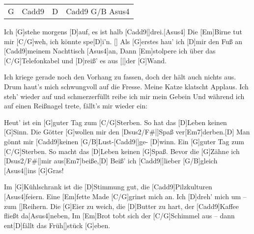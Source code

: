 

\vspace{-0.5em}


\vspace{-1em}
\begin{guitar}
	{\footnotesize\begin{tabular}{|l|l|l|l|}
			G & Cadd9 & D & Cadd9 G/B Asus4 
	\end{tabular}}

	Ich [G]stehe morgens [D]auf, es ist halb [Cadd9|]{drei.}[Asus4]{}
	Die [Em]Birne tut mir [C/G]weh, ich könnte spe[D]i'n. []{}
	Als [G]erstes hau' ich [D]mir den Fuß an [Cadd9]meinem Nachttisch [Asus4]an,
	Dann [Em]stolpere ich über das [C/G]Telefonkabel und [D]reiß' es aus [|]{der} [G]Wand.
	
	Ich kriege gerade noch den Vorhang zu fassen, doch der hält auch nichts aus.
	Drum haut's mich schwungvoll auf die Fresse. Meine Katze klatscht Applaus.
	Ich steh' wieder auf und schmerzerfüllt reibe ich mir mein Gebein
	Und während ich auf einen Reißnagel trete, fällt's mir wieder ein:
	
	\begin{highlightbar}
		Heut' ist ein [G]guter Tag zum [C/G]Sterben.
		So hat das [D]Leben keinen [G]Sinn.
		Die Götter [G]wollen mir den [Dsus2/F#|]{Spaß} ver[Em7]derben.[D]{}
		Man gönnt mir [Cadd9]keinen [G/B]Lust-[Cadd9|]{ge-} [D]winn.
		Ein [G]guter Tag zum [C/G]Sterben.
		So macht das [D]Leben keinen [G]Spaß.
		Bevor die [G]Zähne ich [Dsus2/F#|]{mir }aus[Em7]beiße,[D]{}
		Beiß' ich [Cadd9|]{lieber} [G/B]gleich [Asus4|]{ins} [G]Gras!
	\end{highlightbar}
	
	Im [G]Kühlschrank ist die [D]Stimmung gut, die [Cadd9]Pilzkulturen [Asus4]feiern.
	Eine [Em]fette Made [C/G]grinst mich an. Ich [D]dreh' mich um – zum []Reihern.
	Die [G]Eier zu weich, die [D]Butter zu hart, der [Cadd9]Kaffee fließt da[Asus4]neben,
	Im [Em]Brot tobt sich der [C/G]Schimmel aus – dann ent[D]fällt das Früh[]stück [G]eben.
	

\end{guitar}
